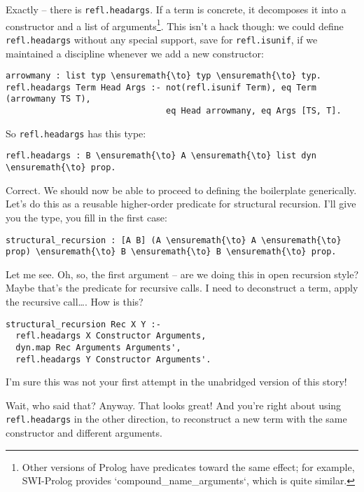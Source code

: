 \heroADVISOR{} Exactly -- there is \texttt{refl.headargs}. If a term is
concrete, it decomposes it into a constructor and a list of
arguments\footnote{Other versions of Prolog have predicates toward the same effect; for example, SWI-Prolog \citep{wielemaker2012swi} provides `compound\_{}name\_{}arguments`, which is quite similar.}.
This isn't a hack though: we could define \texttt{refl.headargs} without
any special support, save for \texttt{refl.isunif}, if we maintained a
discipline whenever we add a new constructor:

\begin{verbatim}
arrowmany : list typ \ensuremath{\to} typ \ensuremath{\to} typ.
refl.headargs Term Head Args :- not(refl.isunif Term), eq Term (arrowmany TS T),
                                eq Head arrowmany, eq Args [TS, T].
\end{verbatim}

\heroSTUDENT{} So \texttt{refl.headargs} has this type:

\begin{verbatim}
refl.headargs : B \ensuremath{\to} A \ensuremath{\to} list dyn \ensuremath{\to} prop.
\end{verbatim}

\heroADVISOR{} Correct. We should now be able to proceed to defining the
boilerplate generically. Let's do this as a reusable higher-order
predicate for structural recursion. I'll give you the type, you fill in
the first case:

\begin{verbatim}
structural_recursion : [A B] (A \ensuremath{\to} A \ensuremath{\to} prop) \ensuremath{\to} B \ensuremath{\to} B \ensuremath{\to} prop.
\end{verbatim}

\heroSTUDENT{} Let me see. Oh, so, the first argument -- are we doing this in
open recursion style? Maybe that's the predicate for recursive calls. I
need to deconstruct a term, apply the recursive call\ldots{}. How is
this?

\begin{verbatim}
structural_recursion Rec X Y :-
  refl.headargs X Constructor Arguments,
  dyn.map Rec Arguments Arguments',
  refl.headargs Y Constructor Arguments'.
\end{verbatim}

\heroAUDIENCE{} I'm sure this was not your first attempt in the unabridged
version of this story!

\heroADVISOR{} Wait, who said that? Anyway. That looks great! And you're right
about using \texttt{refl.headargs} in the other direction, to
reconstruct a new term with the same constructor and different
arguments.

